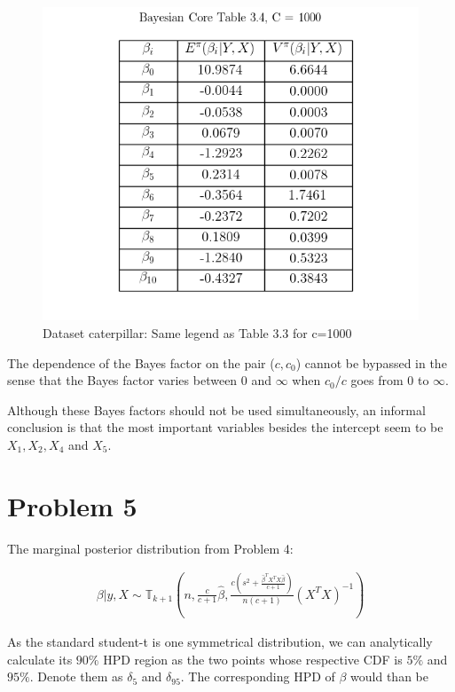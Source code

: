 \documentclass{article}
\begin{document}
\begin{figure}[h!]
\centering
\includegraphics[scale=0.6]{Table3_4.png}
\caption{Dataset caterpillar: Same legend as Table 3.3 for c=1000}
\end{figure}

The dependence of the Bayes factor on the pair ($c,c_{0}$) cannot be bypassed in the sense that the Bayes factor varies between $0$ and $\infty$ when $c_{0}/c$ goes from $0$ to $\infty$. 

Although these Bayes factors should not be used simultaneously, an informal conclusion is that the most important variables besides the intercept seem to be $X_{1},X_{2},X_{4}$ and $X_{5}$.

\newpage
\section{Problem 5}
The marginal posterior distribution from Problem 4:

\begin{equation}
\begin{aligned}
    \beta | y,X \sim \mathbb{T}_{k+1} (n,\frac{c}{c+1}\hat{\beta},\frac{c(s^2+\frac{\hat{\beta}^{T} X^{T} X \hat{\beta}}{c+1})}{n(c+1)}(X^T X)^{-1})
\end{aligned}
\end{equation}

As the standard student-t is one symmetrical distribution, we can analytically calculate its $90\%$ HPD region as the two points whose respective CDF is $5\%$ and $95\%$. Denote them as $\delta_{5}$ and $\delta_{95}$. The corresponding HPD of $\beta$ would than be
\end{document}
